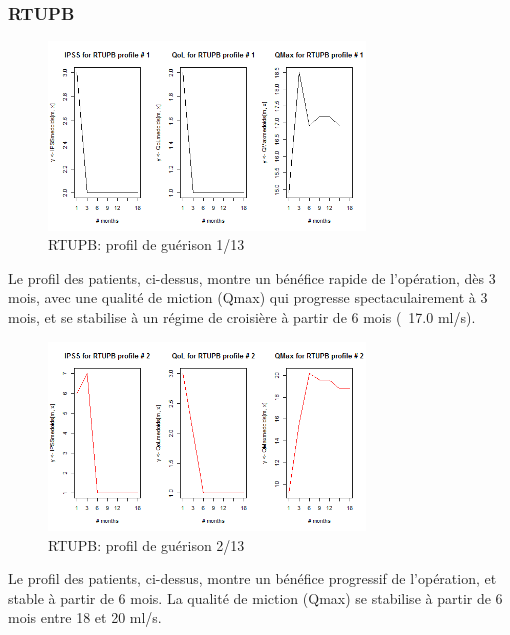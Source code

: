 %
%

%

\subsubsection{RTUPB}

\begin{figure}[H]
\centering
\includegraphics[width=0.75\textwidth]{../Fig/RTUPB/rtupb-profil-post-01.png}
\caption{RTUPB: profil de guérison 1/13}
\label{fig-rtupb-post-profil1}
\end{figure}

Le profil des patients, ci-dessus, montre un bénéfice rapide de l'opération, dès 3 mois, avec une qualité de miction (Qmax) qui progresse spectaculairement à 3 mois, et se stabilise à un régime de croisière à partir de 6 mois (~17.0 ml/s).

\begin{figure}[H]
\centering
\includegraphics[width=0.75\textwidth]{../Fig/RTUPB/rtupb-profil-post-02.png}
\caption{RTUPB: profil de guérison 2/13}
\label{fig-rtupb-post-profil2}
\end{figure}

Le profil des patients, ci-dessus, montre un bénéfice progressif de l'opération, et stable à partir de 6 mois. La qualité de miction (Qmax) se stabilise à partir de 6 mois entre 18 et 20 ml/s.

